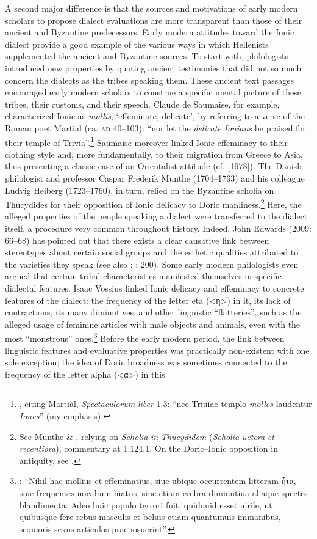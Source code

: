 A second major difference is that the sources and motivations of early modern scholars to propose dialect evaluations are more transparent than those of their ancient and Byzantine predecessors. Early modern attitudes toward the Ionic dialect provide a good example of the various ways in which Hellenists supplemented the ancient and Byzantine sources. To start with, philologists introduced new properties by quoting ancient testimonies that did not so much concern the dialects as the tribes speaking them. These ancient text passages encouraged early modern scholars to construe a specific mental picture of these tribes, their customs, and their speech. Claude de Saumaise, for example, characterized Ionic as \textit{mollis}, ‘effeminate, delicate’, by referring to a verse of the Roman poet Martial (ca. \textsc{ad} 40–103): “nor let the \textit{delicate} \textit{Ionians} be praised for their temple of Trivia”.\footnote{\citet[75]{Saumaise1643a}, citing Martial, \textit{Spectaculorum} \textit{liber} 1.3: “nec Triuiae templo \textit{molles} laudentur \textit{Iones}” (my emphasis).} Saumaise moreover linked Ionic effeminacy to their clothing style and, more fundamentally, to their migration from Greece to Asia, thus presenting a classic case of an Orientalist attitude (cf. \citealt{Said2003} [1978]). The Danish philologist and professor Caspar Frederik Munthe (1704–1763) and his colleague Ludvig Heiberg (1723–1760), in turn, relied on the Byzantine scholia on Thucydides for their opposition of Ionic delicacy to Doric manliness.\footnote{See Munthe \& \citet[15]{Heiberg1748}, relying on \textit{Scholia} \textit{in} \textit{Thucydidem} (\textit{Scholia} \textit{uetera} \textit{et} \textit{recentiora}), commentary at 1.124.1. On the Doric–Ionic opposition in antiquity, see \citet{Cassio1984}.} Here, the alleged properties of the people speaking a dialect were transferred to the dialect itself, a procedure very common throughout history. Indeed, John Edwards (2009: 66–68) has pointed out that there exists a clear causative link between stereotypes about certain social groups and the esthetic qualities attributed to the varieties they speak (see also \citealt{Silverstein2003}; \citealt{Preston2018}: 200). Some early modern philologists even argued that certain tribal characteristics manifested themselves in specific dialectal features. Isaac Vossius linked Ionic delicacy and effeminacy to concrete features of the dialect: the frequency of the letter eta (<η>) in it, its lack of contractions, its many diminutives, and other linguistic “flatteries”, such as the alleged usage of feminine articles with male objects and animals, even with the most “monstrous” ones.\footnote{\citet[55]{Vossius1673}: “Nihil hac mollius et effeminatius, siue ubique occurrentem litteram ἦτα, siue frequentes uocalium hiatus, siue etiam crebra diminutiua aliaque spectes blandimenta. Adeo huic populo terrori fuit, quidquid esset uirile, ut quibusque fere rebus masculis et beluis etiam quantumuis immanibus, sequioris sexus articulos praeposuerint”.} Before the early modern period, the link between linguistic features and evaluative properties was practically non-existent with one sole exception; the idea of Doric broadness was sometimes connected to the frequency of the letter alpha (<α>) in this 